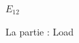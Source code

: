 \documentclass{article}
\begin{document}
\begin{figure}[H]
\begin{minipage}[h]{0.47\linewidth}
         $E_{12}$ \\
    \end{minipage}
    \caption{La partie : Load}
\end{figure}
\end{document}
